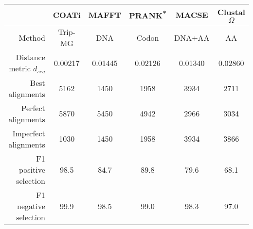 \newcommand*\pct{\scalebox{.9}{\%}}

\begingroup\centering
\setlength{\tabcolsep}{4pt}
\begin{tabular}{r|ccccc}
      & \textbf{COATi} & \textbf{MAFFT} & \textbf{PRANK\textsuperscript{*}} & \textbf{MACSE} & \textbf{Clustal$\Omega$}\\
\hline
Method    & Trip-MG & DNA & Codon & DNA+AA & AA\\[2pt]
Distance metric $d_{seq}$ & \cellcolor{bestcolor}0.00217 & 0.01445 & 0.02126 & 0.01340 & 0.02860\\
Best alignments & \cellcolor{bestcolor}5162 & 1450 & 1958 & 3934 & 2711\\
Perfect alignments & \cellcolor{bestcolor}5870 & 5450 & 4942 & 2966 & 3034\\
Imperfect alignments & \cellcolor{bestcolor}1030 & 1450 & 1958 & 3934 & 3866\\
F1 positive selection & \cellcolor{bestcolor}98.5\pct & 84.7\pct & 89.8\pct & 79.6\pct & 68.1\pct \\
F1 negative selection & \cellcolor{bestcolor}99.9\pct & 98.5\pct & 99.0\pct & 98.3\pct & 97.0\pct
\end{tabular}
\par\endgroup


